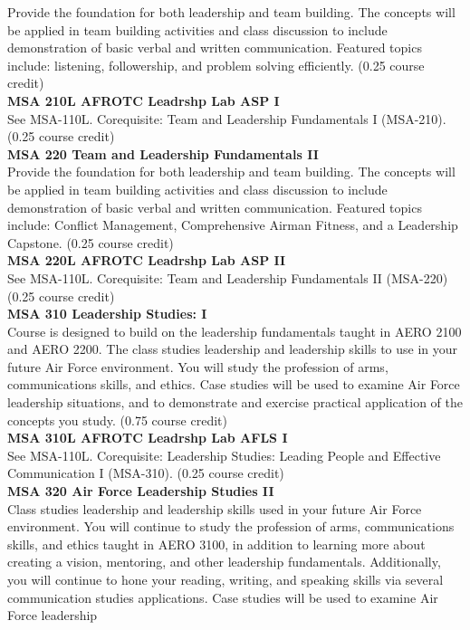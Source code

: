 \documentclass[
  letterpaper,
]{scrbook}
\begin{document}
Provide the foundation for both leadership and team building. The
concepts will be applied in team building activities and class
discussion to include demonstration of basic verbal and written
communication. Featured topics include: listening, followership, and
problem solving efficiently. (0.25 course credit)\\
\textbf{MSA 210L AFROTC Leadrshp Lab ASP I}\\
See MSA-110L. Corequisite: Team and Leadership Fundamentals I (MSA-210).
(0.25 course credit)\\
\textbf{MSA 220 Team and Leadership Fundamentals II}\\
Provide the foundation for both leadership and team building. The
concepts will be applied in team building activities and class
discussion to include demonstration of basic verbal and written
communication. Featured topics include: Conflict Management,
Comprehensive Airman Fitness, and a Leadership Capstone. (0.25 course
credit)\\
\textbf{MSA 220L AFROTC Leadrshp Lab ASP II}\\
See MSA-110L. Corequisite: Team and Leadership Fundamentals II (MSA-220)
(0.25 course credit)\\
\textbf{MSA 310 Leadership Studies: I}\\
Course is designed to build on the leadership fundamentals taught in
AERO 2100 and AERO 2200. The class studies leadership and leadership
skills to use in your future Air Force environment. You will study the
profession of arms, communications skills, and ethics. Case studies will
be used to examine Air Force leadership situations, and to demonstrate
and exercise practical application of the concepts you study. (0.75
course credit)\\
\textbf{MSA 310L AFROTC Leadrshp Lab AFLS I}\\
See MSA-110L. Corequisite: Leadership Studies: Leading People and
Effective Communication I (MSA-310). (0.25 course credit)\\
\textbf{MSA 320 Air Force Leadership Studies II}\\
Class studies leadership and leadership skills used in your future Air
Force environment. You will continue to study the profession of arms,
communications skills, and ethics taught in AERO 3100, in addition to
learning more about creating a vision, mentoring, and other leadership
fundamentals. Additionally, you will continue to hone your reading,
writing, and speaking skills via several communication studies
applications. Case studies will be used to examine Air Force leadership
\end{document}
